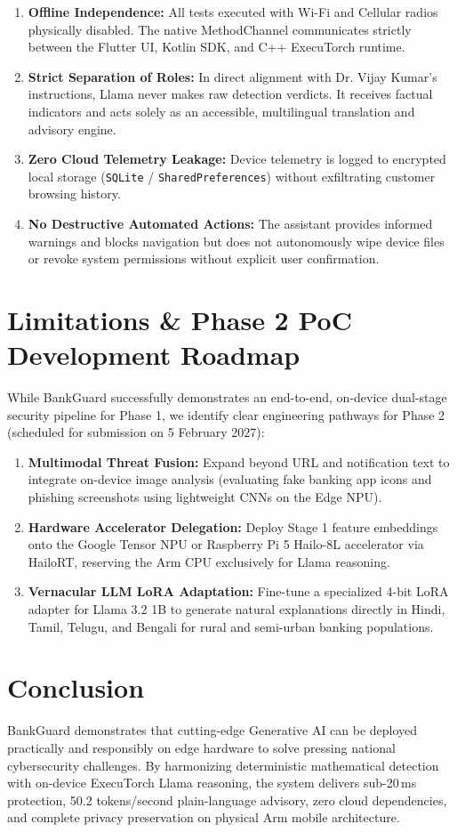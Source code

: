 \documentclass[11pt,a4paper]{article}
\begin{document}
\begin{enumerate}
    \item \textbf{Offline Independence:} All tests executed with Wi-Fi and Cellular radios physically disabled. The native MethodChannel communicates strictly between the Flutter UI, Kotlin SDK, and C++ ExecuTorch runtime.
    \item \textbf{Strict Separation of Roles:} In direct alignment with Dr. Vijay Kumar's instructions, Llama never makes raw detection verdicts. It receives factual indicators and acts solely as an accessible, multilingual translation and advisory engine.
    \item \textbf{Zero Cloud Telemetry Leakage:} Device telemetry is logged to encrypted local storage (\texttt{SQLite} / \texttt{SharedPreferences}) without exfiltrating customer browsing history.
    \item \textbf{No Destructive Automated Actions:} The assistant provides informed warnings and blocks navigation but does not autonomously wipe device files or revoke system permissions without explicit user confirmation.
\end{enumerate}

\section{Limitations \& Phase 2 PoC Development Roadmap}

While BankGuard successfully demonstrates an end-to-end, on-device dual-stage security pipeline for Phase 1, we identify clear engineering pathways for Phase 2 (scheduled for submission on 5 February 2027):
\begin{enumerate}
    \item \textbf{Multimodal Threat Fusion:} Expand beyond URL and notification text to integrate on-device image analysis (evaluating fake banking app icons and phishing screenshots using lightweight CNNs on the Edge NPU).
    \item \textbf{Hardware Accelerator Delegation:} Deploy Stage 1 feature embeddings onto the Google Tensor NPU or Raspberry Pi 5 Hailo-8L accelerator via HailoRT, reserving the Arm CPU exclusively for Llama reasoning.
    \item \textbf{Vernacular LLM LoRA Adaptation:} Fine-tune a specialized 4-bit LoRA adapter for Llama 3.2 1B to generate natural explanations directly in Hindi, Tamil, Telugu, and Bengali for rural and semi-urban banking populations.
\end{enumerate}

\section{Conclusion}
BankGuard demonstrates that cutting-edge Generative AI can be deployed practically and responsibly on edge hardware to solve pressing national cybersecurity challenges. By harmonizing deterministic mathematical detection with on-device ExecuTorch Llama reasoning, the system delivers sub-20\,ms protection, 50.2 tokens/second plain-language advisory, zero cloud dependencies, and complete privacy preservation on physical Arm mobile architecture.
\end{document}
